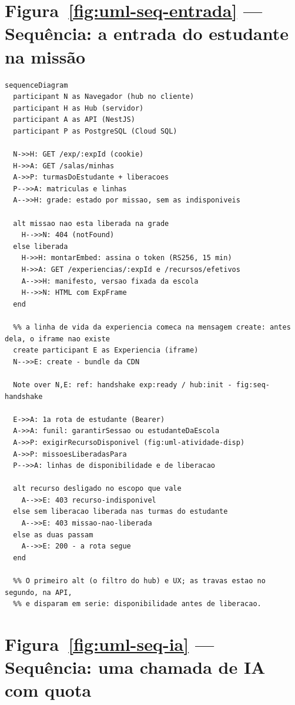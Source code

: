 \section{Figura~\ref{fig:uml-seq-entrada} --- Sequência: a entrada do estudante na missão}

\begin{lstlisting}[language=mermaid]
sequenceDiagram
  participant N as Navegador (hub no cliente)
  participant H as Hub (servidor)
  participant A as API (NestJS)
  participant P as PostgreSQL (Cloud SQL)

  N->>H: GET /exp/:expId (cookie)
  H->>A: GET /salas/minhas
  A->>P: turmasDoEstudante + liberacoes
  P-->>A: matriculas e linhas
  A-->>H: grade: estado por missao, sem as indisponiveis

  alt missao nao esta liberada na grade
    H-->>N: 404 (notFound)
  else liberada
    H->>H: montarEmbed: assina o token (RS256, 15 min)
    H->>A: GET /experiencias/:expId e /recursos/efetivos
    A-->>H: manifesto, versao fixada da escola
    H-->>N: HTML com ExpFrame
  end

  %% a linha de vida da experiencia comeca na mensagem create: antes dela, o iframe nao existe
  create participant E as Experiencia (iframe)
  N-->>E: create - bundle da CDN

  Note over N,E: ref: handshake exp:ready / hub:init - fig:seq-handshake

  E->>A: 1a rota de estudante (Bearer)
  A->>A: funil: garantirSessao ou estudanteDaEscola
  A->>P: exigirRecursoDisponivel (fig:uml-atividade-disp)
  A->>P: missoesLiberadasPara
  P-->>A: linhas de disponibilidade e de liberacao

  alt recurso desligado no escopo que vale
    A-->>E: 403 recurso-indisponivel
  else sem liberacao liberada nas turmas do estudante
    A-->>E: 403 missao-nao-liberada
  else as duas passam
    A-->>E: 200 - a rota segue
  end

  %% O primeiro alt (o filtro do hub) e UX; as travas estao no segundo, na API,
  %% e disparam em serie: disponibilidade antes de liberacao.
\end{lstlisting}

\section{Figura~\ref{fig:uml-seq-ia} --- Sequência: uma chamada de IA com quota}

